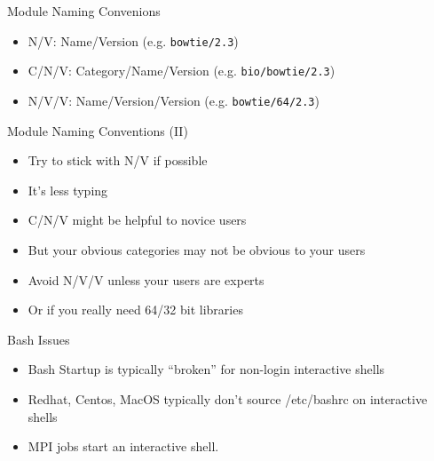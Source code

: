 \documentclass[dvipsnames,aspectratio=169]{beamer}
\begin{document}
%

\begin{frame}{Module Naming Convenions}
  \begin{itemize}
    \item N/V:   Name/Version (e.g. \texttt{bowtie/2.3})
    \item C/N/V: Category/Name/Version (e.g. \texttt{bio/bowtie/2.3})
    \item N/V/V: Name/Version/Version (e.g. \texttt{bowtie/64/2.3})
  \end{itemize}
\end{frame}

\begin{frame}{Module Naming Conventions (II)}
  \begin{itemize}
    \item Try to stick with N/V if possible
    \item It's less typing
    \item C/N/V might be helpful to novice users
    \item But your obvious categories may not be obvious to your users
    \item Avoid N/V/V unless your users are experts 
    \item Or if you really need 64/32 bit libraries
  \end{itemize}
\end{frame}

\begin{frame}{Bash Issues}
  \begin{itemize}
    \item Bash Startup is typically ``broken'' for non-login interactive shells
    \item Redhat, Centos, MacOS typically don't source /etc/bashrc on interactive shells
    \item MPI jobs start an interactive shell.
  \end{itemize}
\end{frame}
\end{document}
